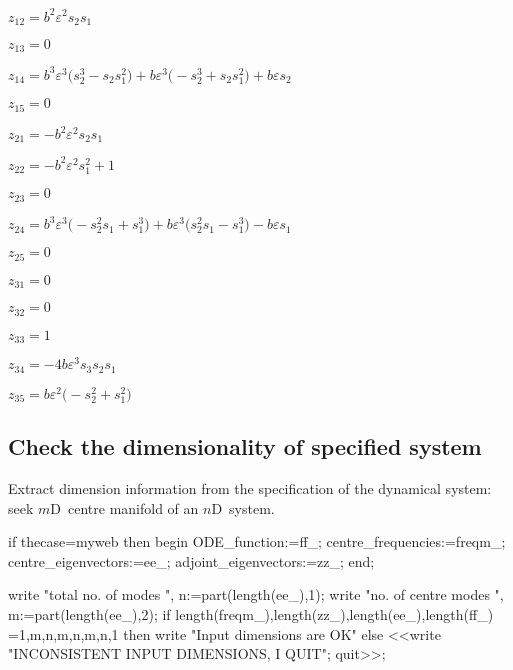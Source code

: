 \documentclass[11pt,a5paper]{article}
\def\eps{\varepsilon}
\begin{document}
\(z_{12}=b^{2} \eps^{2} s_{2} s_{1}
\)\par

\(z_{13}=0
\)\par

\(z_{14}=b^{3} \eps^{3} \big(s_{2}^{3}-s_{2} s_{1}^{2}\big)+b \eps^{3} 
\big(-s_{2}^{3}+s_{2} s_{1}^{2}\big)+b \eps s_{2}
\)\par

\(z_{15}=0
\)\par

\(z_{21}=-b^{2} \eps^{2} s_{2} s_{1}
\)\par

\(z_{22}=-b^{2} \eps^{2} s_{1}^{2}+1
\)\par

\(z_{23}=0
\)\par

\(z_{24}=b^{3} \eps^{3} \big(-s_{2}^{2} s_{1}+s_{1}^{3}\big)+b \eps^{3} 
\big(s_{2}^{2} s_{1}-s_{1}^{3}\big)-b \eps s_{1}
\)\par

\(z_{25}=0
\)\par

\(z_{31}=0
\)\par

\(z_{32}=0
\)\par

\(z_{33}=1
\)\par

\(z_{34}=-4 b \eps^{3} s_{3} s_{2} s_{1}
\)\par

\(z_{35}=b \eps^{2} \big(-s_{2}^{2}+s_{1}^{2}\big)
\)\par

 


\subsection{Check the dimensionality of specified system}
Extract dimension information from the specification of the dynamical system: seek $m$D~centre manifold of an $n$D~system.

\begin{reduce}
if thecase=myweb then begin
  ODE_function:=ff_; 
  centre_frequencies:=freqm_;
  centre_eigenvectors:=ee_; 
  adjoint_eigenvectors:=zz_;
end;
\end{reduce}

\begin{reduce}
write "total no. of modes  ",
n:=part(length(ee_),1);
write "no. of centre modes ",
m:=part(length(ee_),2);
if {length(freqm_),length(zz_),length(ee_),length(ff_)}
  ={{1,m},{n,m},{n,m},{n,1}} 
  then write "Input dimensions are OK" 
  else <<write "INCONSISTENT INPUT DIMENSIONS, I QUIT"; 
      quit>>;
\end{reduce}
\end{document}
